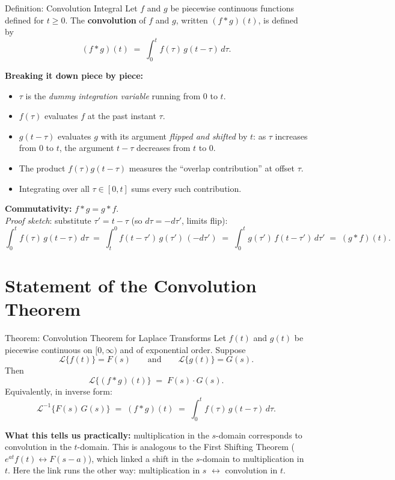\documentclass[12pt,a4paper]{article}
\begin{document}
\begin{infobox}{Definition: Convolution Integral}
Let $f$ and $g$ be piecewise continuous functions defined for $t\ge 0$.
The \textbf{convolution} of $f$ and $g$, written $(f*g)(t)$, is defined by
\[
  (f*g)(t) \;=\; \int_0^t f(\tau)\,g(t-\tau)\,d\tau.
\]

\medskip
\textbf{Breaking it down piece by piece:}
\begin{itemize}[nosep]
  \item $\tau$ is the \emph{dummy integration variable} running from $0$ to $t$.
  \item $f(\tau)$ evaluates $f$ at the past instant $\tau$.
  \item $g(t-\tau)$ evaluates $g$ with its argument \emph{flipped and shifted} by $t$:
        as $\tau$ increases from $0$ to $t$, the argument $t-\tau$ decreases from $t$ to $0$.
  \item The product $f(\tau)g(t-\tau)$ measures the ``overlap contribution'' at offset $\tau$.
  \item Integrating over all $\tau\in[0,t]$ sums every such contribution.
\end{itemize}

\medskip
\textbf{Commutativity:} $f{*}g = g{*}f$.\\
\emph{Proof sketch}: substitute $\tau' = t-\tau$ (so $d\tau=-d\tau'$, limits flip):
\[
  \int_0^t f(\tau)\,g(t-\tau)\,d\tau
  \;=\; \int_t^0 f(t-\tau')\,g(\tau')\,(-d\tau')
  \;=\; \int_0^t g(\tau')\,f(t-\tau')\,d\tau'
  \;=\; (g*f)(t).
\]
\end{infobox}

\section{Statement of the Convolution Theorem}

\begin{infobox}{Theorem: Convolution Theorem for Laplace Transforms}
Let $f(t)$ and $g(t)$ be piecewise continuous on $[0,\infty)$ and of exponential order.
Suppose
\[
  \mathcal{L}\{f(t)\} = F(s) \qquad \text{and} \qquad \mathcal{L}\{g(t)\} = G(s).
\]
Then
\[
  \boxed{\mathcal{L}\{(f*g)(t)\} \;=\; F(s)\cdot G(s).}
\]
Equivalently, in inverse form:
\[
  \boxed{\mathcal{L}^{-1}\{F(s)\,G(s)\} \;=\; (f*g)(t) \;=\; \int_0^t f(\tau)\,g(t-\tau)\,d\tau.}
\]

\medskip
\textbf{What this tells us practically:} multiplication in the $s$-domain corresponds to
convolution in the $t$-domain. This is analogous to the First Shifting Theorem ($e^{at}f(t)
\leftrightarrow F(s-a)$), which linked a shift in the $s$-domain to multiplication in $t$.
Here the link runs the other way: multiplication in $s$ $\leftrightarrow$ convolution in $t$.
\end{infobox}
\end{document}
